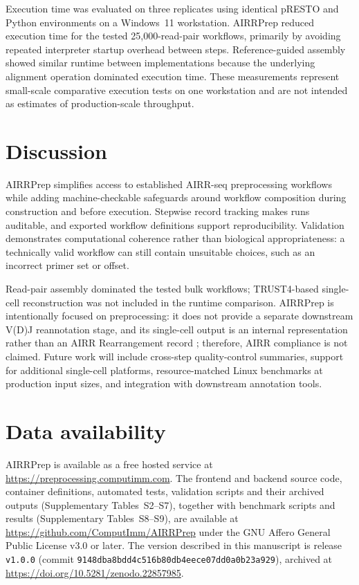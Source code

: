 \documentclass[unnumsec,webpdf,contemporary,large]{oup-authoring-template}
\begin{document}
Execution time was evaluated on three replicates using identical
pRESTO and Python environments on a Windows~11 workstation.
AIRRPrep reduced execution time for the tested 25,000-read-pair
workflows, primarily by avoiding repeated interpreter startup overhead
between steps. Reference-guided assembly showed similar runtime
between implementations because the underlying alignment operation
dominated execution time. These measurements represent small-scale
comparative execution tests on one workstation and are not intended
as estimates of production-scale throughput.

\section{Discussion}

AIRRPrep simplifies access to established AIRR-seq preprocessing workflows while adding machine-checkable safeguards around workflow composition during construction and before execution. Stepwise record tracking makes runs auditable, and exported workflow definitions support reproducibility. Validation demonstrates computational coherence rather than biological appropriateness: a technically valid workflow can still contain unsuitable choices, such as an incorrect primer set or offset.

Read-pair assembly dominated the tested bulk workflows; TRUST4-based single-cell reconstruction was not included in the runtime comparison. AIRRPrep is intentionally focused on preprocessing: it does not provide a separate downstream V(D)J reannotation stage, and its single-cell output is an internal representation rather than an AIRR Rearrangement record \citep{vanderheiden2018}; therefore, AIRR compliance is not claimed. Future work will include cross-step quality-control summaries, support for additional single-cell platforms, resource-matched Linux benchmarks at production input sizes, and integration with downstream annotation tools.

\section*{Data availability}

AIRRPrep is available as a free hosted service at
\url{https://preprocessing.computimm.com}. The frontend and backend source
code, container definitions, automated tests, validation scripts and their
archived outputs (Supplementary Tables~S2--S7), together with benchmark
scripts and results (Supplementary Tables~S8--S9), are available at
\url{https://github.com/ComputImm/AIRRPrep} under the GNU Affero General
Public License v3.0 or later. The version described in this manuscript is
release \texttt{v1.0.0} (commit
\texttt{9148dba8bdd4c516b80db4eece07dd0a0b23a929}), archived at
\url{https://doi.org/10.5281/zenodo.22857985}.
\end{document}
